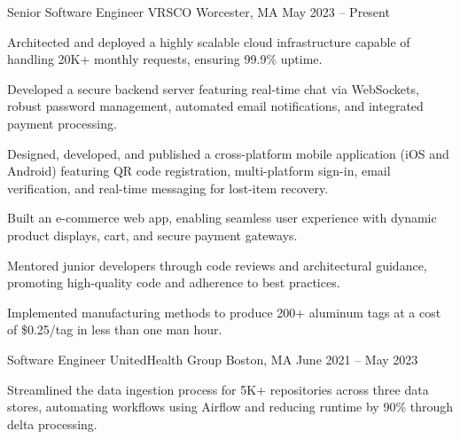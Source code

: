

\begin{cventries}

  \cventry
    {Senior Software Engineer} %
    {VRSCO} %
    {Worcester, MA} %
    {May 2023 – Present}
    {
      \begin{cvitems} %
          \item {Architected and deployed a highly scalable cloud infrastructure capable of handling 20K+ monthly requests, ensuring 99.9\% uptime.}
          \item {Developed a secure backend server featuring real-time chat via WebSockets, robust password management, automated email notifications, and integrated payment processing.}
          \item {Designed, developed, and published a cross-platform mobile application (iOS and Android) featuring QR code registration, multi-platform sign-in, email verification, and real-time messaging for lost-item recovery.}
          \item {Built an e-commerce web app, enabling seamless user experience with dynamic product displays, cart, and secure payment gateways.}
          \item {Mentored junior developers through code reviews and architectural guidance, promoting high-quality code and adherence to best practices.}
          \item {Implemented manufacturing methods to produce 200+ aluminum tags at a cost of \$0.25/tag in less than one man hour.}
      \end{cvitems}
    }
  \cventry
    {Software Engineer} %
    {UnitedHealth Group} %
    {Boston, MA} %
    {June 2021 – May 2023} %
    {
      \begin{cvitems} %
        \item {Streamlined the data ingestion process for 5K+ repositories across three data stores, automating workflows using Airflow and reducing runtime by 90\% through delta processing.}

\end{cvitems}}
\end{cventries}
